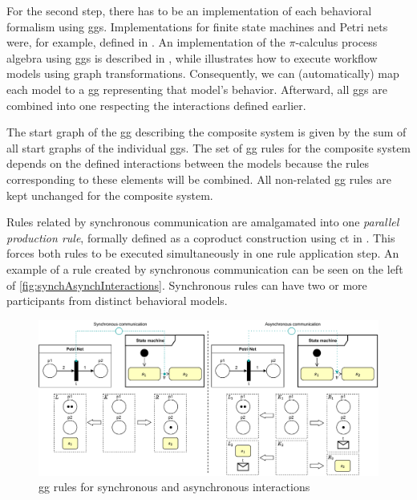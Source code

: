 \documentclass[a4paper]{easychair}
\begin{document}
For the second step, there has to be an implementation of each behavioral formalism using \glspl*{gg}.
Implementations for finite state machines and Petri nets were, for example, defined in \cite{krauterBehavioralConsistencyHeterogeneous2021}.
An implementation of the $\pi$-calculus process algebra using \glspl*{gg} is described in \cite{gadducciGraphRewritingPcalculus2007}, while \cite{rutleMetamodellingApproachBehavioural2012} illustrates how to execute workflow models using graph transformations.
Consequently, we can (automatically) map each model to a \gls*{gg} representing that model's behavior.
Afterward, all \glspl*{gg} are combined into one respecting the interactions defined earlier.

The start graph of the \gls*{gg} describing the composite system is given by the sum of all start graphs of the individual \glspl*{gg}.
The set of \gls*{gg} rules for the composite system depends on the defined interactions between the models because the rules corresponding to these elements will be combined.
All non-related \gls*{gg} rules are kept unchanged for the composite system.

Rules related by synchronous communication are amalgamated into one \textit{parallel production rule}, formally defined as a coproduct construction using \gls*{ct} in \cite[Def. 3.2.7]{baldanConcurrentSemanticsAlgebraic1999}.
This forces both rules to be executed simultaneously in one rule application step. 
An example of a rule created by synchronous communication can be seen on the left of \autoref{fig:synchAsynchInteractions}.
Synchronous rules can have two or more participants from distinct behavioral models.  

\begin{figure}[h]
    \centering
    \includegraphics[width=1\textwidth]{images/synch_asynch.pdf}
    \caption{\gls*{gg} rules for synchronous and asynchronous interactions}
    \label{fig:synchAsynchInteractions}
\end{figure}
\end{document}
